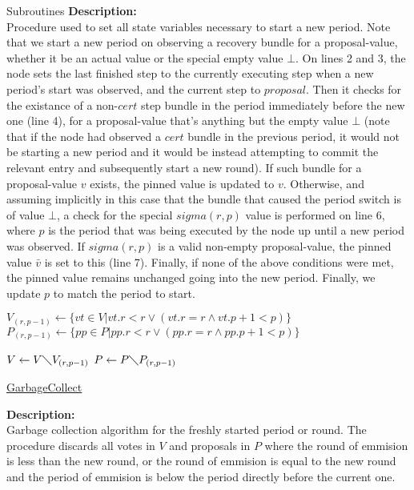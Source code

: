 \documentclass[10pt,a4paper]{article}
\begin{document}
\begin{section}{Subroutines}
\noindent \textbf{Description:}\\
Procedure used to set all state variables necessary to start a new period.
Note that we start a new period on observing a recovery bundle for a proposal-value, whether it be
an actual value or the special empty value $\bot$.
On lines 2 and 3, the node sets the last finished step to the currently executing step when a new period's
start was observed, and the current step to $proposal$.
Then it checks for the existance of a non-$cert$ step bundle in the period immediately before the new one (line 4), 
for a proposal-value that's anything but the empty value $\bot$ (note that if the node had observed a $cert$
bundle in the previous period, it would not be starting a new period and it would be instead attempting to commit
the relevant entry and subsequently start a new round). If such bundle for a proposal-value $v$ exists, the pinned 
value is updated to $v$.
Otherwise, and assuming implicitly in this case that the bundle that caused the period switch is of value $\bot$,
a check for the special $sigma(r,p)$ value is performed on line 6, where $p$ is the period that was being executed 
by the node up until a new period was observed. If $sigma(r,p)$ is a valid non-empty proposal-value, the pinned 
value $\bar{v}$ is set to this (line 7).
Finally, if none of the above conditions were met, the pinned value remains unchanged going into the new period.
Finally, we update $p$ to match the period to start.


\begin{algorithm}[H]
    \begin{algorithmic}[1]

    \State $V_{(r,p-1)} \gets \{ vt \in V | vt.r < r \lor (vt.r=r \land vt.p + 1 < p) \}$
    \State $P_{(r,p-1)} \gets \{ pp \in P | pp.r < r \lor (pp.r=r \land pp.p + 1 < p) \}$

    \State $V \gets V\diagdown V_{(r,p-1)}$
    \State $P \gets P\diagdown P_{(r,p-1)}$

    \EndFunction
    \end{algorithmic}
    \caption{\underline{GarbageCollect}}
\end{algorithm}

\noindent \textbf{Description:}\\
Garbage collection algorithm for the freshly started period or round.
The procedure discards all votes in $V$ and proposals in $P$ where the round of emmision is less than the
new round, or the round of emmision is equal to the new round and the period of emmision is below the period
directly before the current one.


\end{section}
\end{document}
